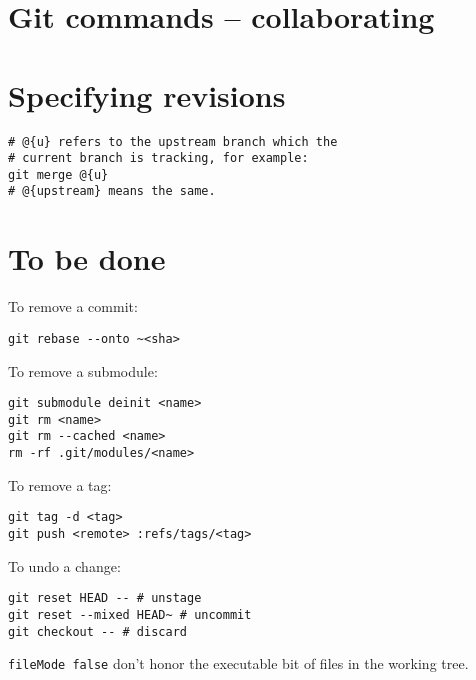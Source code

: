 \documentclass{charuun}
\begin{document}
\section{Git commands -- collaborating}





\section{Specifying revisions}
\begin{verbatim}
# @{u} refers to the upstream branch which the
# current branch is tracking, for example:
git merge @{u}
# @{upstream} means the same.
\end{verbatim}

\section{To be done}
To remove a commit:
\begin{verbatim}
git rebase --onto ~<sha>
\end{verbatim}

To remove a submodule:
\begin{verbatim}
git submodule deinit <name>
git rm <name>
git rm --cached <name>
rm -rf .git/modules/<name>
\end{verbatim}

To remove a tag:
\begin{verbatim}
git tag -d <tag>
git push <remote> :refs/tags/<tag>
\end{verbatim}

To undo a change:
\begin{verbatim}
git reset HEAD -- # unstage
git reset --mixed HEAD~ # uncommit
git checkout -- # discard
\end{verbatim}


\texttt{fileMode false} don't honor the executable bit of files in the working tree.
\end{document}
